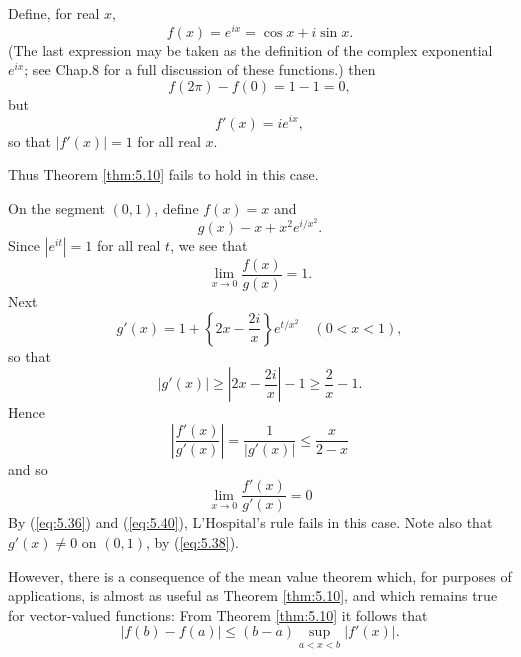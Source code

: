\begin{myExample}
    Define, for real $x$,
    \begin{equation}
        \label{eq:5.32}
        f(x) = e^{ix} = \cos x + i \sin x.
    \end{equation}
    (The last expression may be taken as the definition of the complex exponential $e^{ix}$; see Chap.8 for a full discussion of these functions.)
    then 
    \begin{equation}
        \label{eq:5.33}
        f(2 \pi) - f(0) = 1 - 1 = 0,
    \end{equation}
    but 
    \begin{equation}
        f'(x) = ie^{ix},
    \end{equation}
    so that $\left| f'(x) \right| = 1$ for all real $x$.

    Thus Theorem \ref{thm:5.10} fails to hold in this case.
\end{myExample}

\begin{myExample}
    On the segment $(0, 1)$, define $f(x) = x$ and 
    \begin{equation}
        g(x) - x + x^2 e^{i/x^2}.
    \end{equation}
    Since $\left| e^{it} \right| = 1$ for all real $t$, we see that 
    \begin{equation}
        \label{eq:5.36}
        \lim_{x \to 0} \frac{f(x)}{g(x)} = 1.
    \end{equation}
    Next 
    \begin{equation}
        \label{eq:5.37}
        g'(x) = 1 + \left\{ 2x - \frac{2i}{x} \right\}e^{t/x^2}
        \quad (0 < x < 1),
    \end{equation}
    so that 
    \begin{equation}
        \label{eq:5.38}
        \left| g'(x) \right| \geq
        \left| 2x - \frac{2i}{x} \right| -1 \geq
        \frac{2}{x} - 1.
    \end{equation}
    Hence 
    \begin{equation}
        \label{eq:5.39}
        \left| \frac{f'(x)}{g'(x)} \right| =
        \frac{1}{\left| g'(x) \right|} \leq
        \frac{x}{2 - x}
    \end{equation}
    and so 
    \begin{equation}
        \label{eq:5.40}
        \lim_{x \to 0} \frac{f'(x)}{g'(x)} = 0
    \end{equation}
    By (\ref{eq:5.36}) and (\ref{eq:5.40}), 
    L'Hospital's rule fails in this case. 
    Note also that $g'(x) \neq 0$ on $(0, 1)$, by (\ref{eq:5.38}).

    However, there is a consequence of the mean value theorem 
    which, for purposes of applications, 
    is almost as useful as Theorem \ref{thm:5.10}, 
    and which remains true for vector-valued functions: 
    From Theorem \ref{thm:5.10} it follows that
    \begin{equation}
        \label{eq:5.41}
        \left| f(b) - f(a) \right| \leq
        (b-a) \sup_{a < x < b} \left| f'(x) \right| .
    \end{equation}
\end{myExample}


